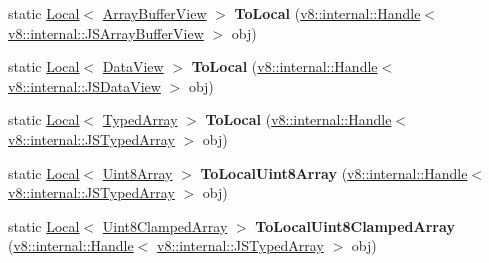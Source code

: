 \begin{DoxyCompactItemize}
\item 
\mbox{\label{classv8_1_1Utils_ad4a90baf574da81c4906d7ea564e1d60}} 
static \mbox{\hyperlink{classv8_1_1Local}{Local}}$<$ \mbox{\hyperlink{classv8_1_1ArrayBufferView}{Array\+Buffer\+View}} $>$ {\bfseries To\+Local} (\mbox{\hyperlink{classv8_1_1internal_1_1Handle}{v8\+::internal\+::\+Handle}}$<$ \mbox{\hyperlink{classv8_1_1internal_1_1JSArrayBufferView}{v8\+::internal\+::\+J\+S\+Array\+Buffer\+View}} $>$ obj)
\item 
\mbox{\label{classv8_1_1Utils_a5a80d6ff948e3e66ae0338b27285d943}} 
static \mbox{\hyperlink{classv8_1_1Local}{Local}}$<$ \mbox{\hyperlink{classv8_1_1DataView}{Data\+View}} $>$ {\bfseries To\+Local} (\mbox{\hyperlink{classv8_1_1internal_1_1Handle}{v8\+::internal\+::\+Handle}}$<$ \mbox{\hyperlink{classv8_1_1internal_1_1JSDataView}{v8\+::internal\+::\+J\+S\+Data\+View}} $>$ obj)
\item 
\mbox{\label{classv8_1_1Utils_a501a607d456e364d40083fc8a8874c78}} 
static \mbox{\hyperlink{classv8_1_1Local}{Local}}$<$ \mbox{\hyperlink{classv8_1_1TypedArray}{Typed\+Array}} $>$ {\bfseries To\+Local} (\mbox{\hyperlink{classv8_1_1internal_1_1Handle}{v8\+::internal\+::\+Handle}}$<$ \mbox{\hyperlink{classv8_1_1internal_1_1JSTypedArray}{v8\+::internal\+::\+J\+S\+Typed\+Array}} $>$ obj)
\item 
\mbox{\label{classv8_1_1Utils_ae22804d5beaa2c8fe0761d137963f553}} 
static \mbox{\hyperlink{classv8_1_1Local}{Local}}$<$ \mbox{\hyperlink{classv8_1_1Uint8Array}{Uint8\+Array}} $>$ {\bfseries To\+Local\+Uint8\+Array} (\mbox{\hyperlink{classv8_1_1internal_1_1Handle}{v8\+::internal\+::\+Handle}}$<$ \mbox{\hyperlink{classv8_1_1internal_1_1JSTypedArray}{v8\+::internal\+::\+J\+S\+Typed\+Array}} $>$ obj)
\item 
\mbox{\label{classv8_1_1Utils_a5e7913057929857dea7a19f79f3ab36f}} 
static \mbox{\hyperlink{classv8_1_1Local}{Local}}$<$ \mbox{\hyperlink{classv8_1_1Uint8ClampedArray}{Uint8\+Clamped\+Array}} $>$ {\bfseries To\+Local\+Uint8\+Clamped\+Array} (\mbox{\hyperlink{classv8_1_1internal_1_1Handle}{v8\+::internal\+::\+Handle}}$<$ \mbox{\hyperlink{classv8_1_1internal_1_1JSTypedArray}{v8\+::internal\+::\+J\+S\+Typed\+Array}} $>$ obj)
\item 

\end{DoxyCompactItemize}
